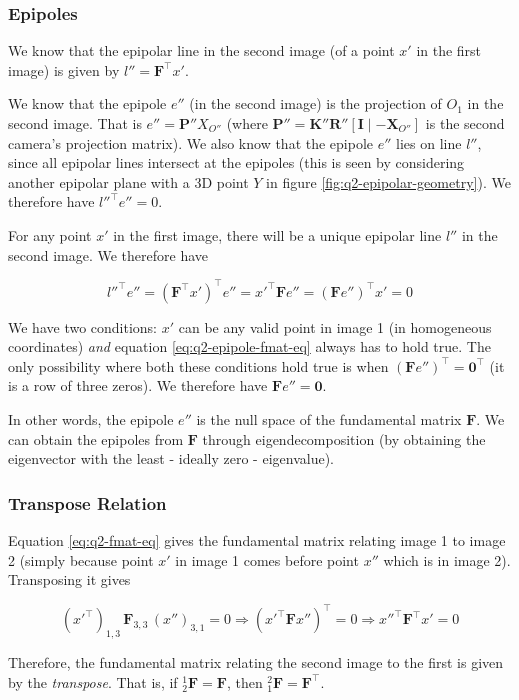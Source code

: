 \subsubsection*{Epipoles}

We know that the epipolar line in the second image (of a point $x'$ in the first image) is given by $l'' = \mathbf{F}^\top x'$.

We know that the epipole $e''$ (in the second image) is the projection of $O_1$ in the second image. That is $e'' = \mathbf{P}'' X_{O''}$ (where $\mathbf{P}'' = \mathbf{K}'' \mathbf{R}'' \left [ \mathbf{I} \mid -\mathbf{X}_{O''} \right ]$ is the second camera's projection matrix). We also know that the epipole $e''$ lies on line $l''$, since all epipolar lines intersect at the epipoles (this is seen by considering another epipolar plane with a 3D point $Y$ in figure \ref{fig:q2-epipolar-geometry}). We therefore have $l''^\top e'' = 0$.

For any point $x'$ in the first image, there will be a unique epipolar line $l''$ in the second image. We therefore have

\begin{equation}
    l''^\top e'' = \left ( \mathbf{F}^\top x' \right )^\top e'' = x'^\top \mathbf{F} e'' = \left ( \mathbf{F} e'' \right )^\top x' = 0
    \label{eq:q2-epipole-fmat-eq}
\end{equation}

We have two conditions: $x'$ can be any valid point in image 1 (in homogeneous coordinates) \textit{and} equation \ref{eq:q2-epipole-fmat-eq} always has to hold true. The only possibility where both these conditions hold true is when $\left ( \mathbf{F} e'' \right )^\top = \mathbf{0}^\top$ (it is a row of three zeros). We therefore have $\mathbf{F} e'' = \mathbf{0}$.

In other words, the epipole $e''$ is the null space of the fundamental matrix $\mathbf{F}$. We can obtain the epipoles from $\mathbf{F}$ through eigendecomposition (by obtaining the eigenvector with the least - ideally zero - eigenvalue).

\subsubsection*{Transpose Relation}

Equation \ref{eq:q2-fmat-eq} gives the fundamental matrix relating image 1 to image 2 (simply because point $x'$ in image 1 comes before point $x''$ which is in image 2). Transposing it gives

\begin{equation}
    (x'^\top)_{1,3} \, \mathbf{F}_{3,3} \, (x'')_{3, 1} = 0 \Rightarrow \left ( x'^\top \mathbf{F} x'' \right )^\top = 0
    \Rightarrow x''^\top \mathbf{F}^\top x' = 0
    \label{eq:q2-fmat-transpose-rel}
\end{equation}

Therefore, the fundamental matrix relating the second image to the first is given by the \textit{transpose}. That is, if $^1_2\mathbf{F} = \mathbf{F}$, then $^2_1\mathbf{F} = \mathbf{F}^\top$.
